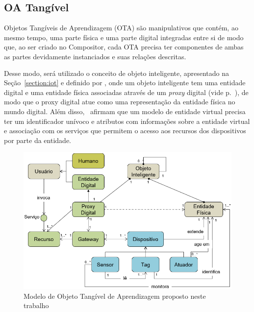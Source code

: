 


\subsection{OA Tangível}\label{section:OA_fisicovirtual}

Objetos Tangíveis de Aprendizagem (OTA) são manipulativos que contém, ao mesmo tempo, uma parte física e uma parte digital integradas entre si de modo que, ao ser criado no Compositor, cada OTA precisa ter componentes de ambas as partes devidamente instanciados e suas relações descritas.

Desse modo, será utilizado o conceito de objeto inteligente, apresentado na Seção~\ref{section:iot} e definido por \cite{serbanati:2011}, onde um objeto inteligente tem uma entidade digital e uma entidade física associadas através de um \textit{proxy} digital (vide p.~\pageref{fig:modeloiot}), de modo que o proxy digital atue como uma representação da entidade física no mundo digital. Além disso,~\cite{pires:2015} afirmam que um modelo de entidade virtual precisa ter um identificador unívoco e 
atributos com informações sobre a entidade virtual e associação com os serviços que permitem o acesso aos recursos dos dispositivos por parte da entidade.

\begin{figure}[ht]
	\centering
	\includegraphics[width=0.8\linewidth]{chapters/proposedMethod/modelo_OTA.png}
	\caption{Modelo de Objeto Tangível de Aprendizagem proposto neste trabalho}
	\label{fig:modelo_ota}
\end{figure}

